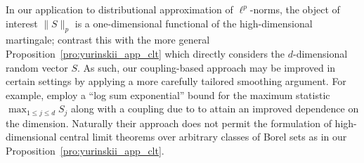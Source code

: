 \begin{remark}
  In our application to distributional approximation of $\ell^p$-norms,
  the object of interest $\|S\|_p$ is a
  one-dimensional functional of the high-dimensional martingale;
  contrast this with the more general Proposition~\ref{pro:yurinskii_app_clt}
  which
  directly considers the $d$-dimensional random vector $S$.
  As such, our coupling-based approach may be improved in certain settings
  by applying a more carefully tailored smoothing argument.
  For example, \citet{belloni2018high}
  employ a ``log sum exponential'' bound
  \citep[see also][]{chernozhukov2013gaussian}
  for the maximum statistic
  $\max_{1 \leq j \leq d} S_j$
  along with a coupling due to \citet{chernozhukov2014gaussian} to attain
  an improved dependence on the dimension.
  Naturally their approach does not permit the formulation of
  high-dimensional central limit theorems over arbitrary classes of
  Borel sets as in our Proposition~\ref{pro:yurinskii_app_clt}.
\end{remark}
